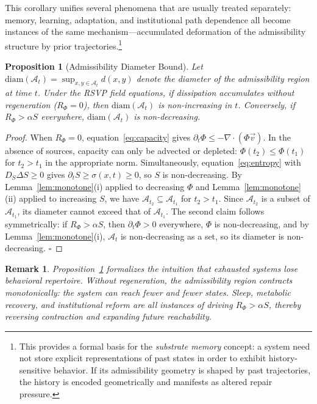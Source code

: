 \documentclass[12pt,a4paper]{article}
\newtheorem{proposition}[theorem]{Proposition}
\newtheorem{remark}[theorem]{Remark}
\begin{document}
This corollary unifies several phenomena that are usually treated separately: memory, learning, adaptation, and institutional path dependence all become instances of the same mechanism---accumulated deformation of the admissibility structure by prior trajectories.\footnote{This provides a formal basis for the \emph{substrate memory} concept: a system need not store explicit representations of past states in order to exhibit history-sensitive behavior. If its admissibility geometry is shaped by past trajectories, the history is encoded geometrically and manifests as altered repair pressure.}

\begin{proposition}[Admissibility Diameter Bound]
\label{prop:diameter}
Let $\mathrm{diam}(\mathcal{A}_t) = \sup_{x,y \in \mathcal{A}_t} d(x,y)$ denote the diameter of the admissibility region at time $t$. Under the RSVP field equations, if dissipation accumulates without regeneration ($R_\Phi = 0$), then $\mathrm{diam}(\mathcal{A}_t)$ is non-increasing in $t$. Conversely, if $R_\Phi > \alpha S$ everywhere, $\mathrm{diam}(\mathcal{A}_t)$ is non-decreasing.
\end{proposition}

\begin{proof}
When $R_\Phi = 0$, equation~\eqref{eq:capacity} gives $\partial_t \Phi \leq -\nabla\cdot(\Phi\vec{v})$. In the absence of sources, capacity can only be advected or depleted: $\Phi(t_2) \leq \Phi(t_1)$ for $t_2 > t_1$ in the appropriate norm. Simultaneously, equation~\eqref{eq:entropy} with $D_S\Delta S\geq 0$ gives $\partial_t S \geq \sigma(x,t) \geq 0$, so $S$ is non-decreasing. By Lemma~\ref{lem:monotone}(i) applied to decreasing $\Phi$ and Lemma~\ref{lem:monotone}(ii) applied to increasing $S$, we have $\mathcal{A}_{t_2} \subseteq \mathcal{A}_{t_1}$ for $t_2 > t_1$. Since $\mathcal{A}_{t_2}$ is a subset of $\mathcal{A}_{t_1}$, its diameter cannot exceed that of $\mathcal{A}_{t_1}$. The second claim follows symmetrically: if $R_\Phi > \alpha S$, then $\partial_t\Phi > 0$ everywhere, $\Phi$ is non-decreasing, and by Lemma~\ref{lem:monotone}(i), $\mathcal{A}_t$ is non-decreasing as a set, so its diameter is non-decreasing. $\square$
\end{proof}

\begin{remark}
Proposition~\ref{prop:diameter} formalizes the intuition that exhausted systems lose behavioral repertoire. Without regeneration, the admissibility region contracts monotonically: the system can reach fewer and fewer states. Sleep, metabolic recovery, and institutional reform are all instances of driving $R_\Phi > \alpha S$, thereby reversing contraction and expanding future reachability.
\end{remark}
\end{document}
